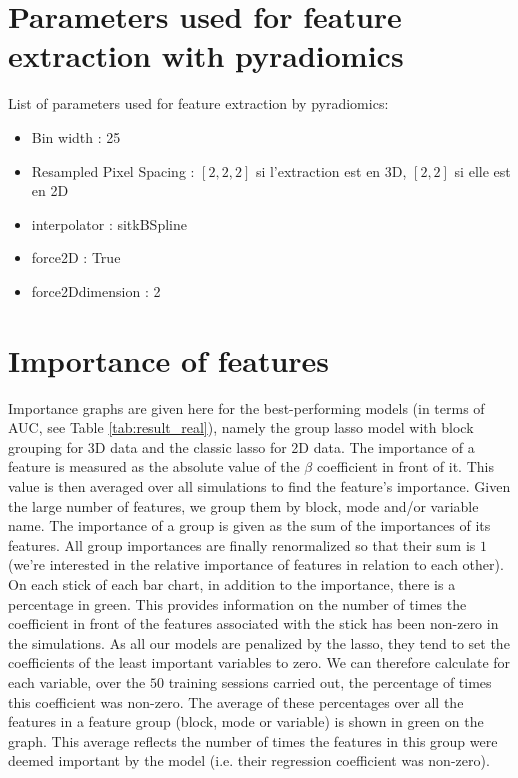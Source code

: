 \documentclass[preprint,12pt]{elsarticle}
\begin{document}
\newpage

\section{Parameters used for feature extraction with pyradiomics}
\label{annexeparam}

List of parameters used for feature extraction by pyradiomics:
 
\begin{itemize}[label = $\bullet$]
    \item Bin width : 25
    \item Resampled Pixel Spacing : $[2,2,2]$ si l'extraction est en 3D, $[2,2]$ si elle est en 2D
    \item interpolator : sitkBSpline
    \item force2D : True
    \item force2Ddimension : 2
\end{itemize}


\newpage 
\section{Importance of features}
\label{annexe:importance}
\noindent Importance graphs are given here for the best-performing models (in terms of AUC, see Table \ref{tab:result_real}), namely the group lasso model with block grouping for 3D data and the classic lasso for 2D data. The importance of a feature is measured as the absolute value of the $\beta$ coefficient in front of it. This value is then averaged over all simulations to find the feature's importance. Given the large number of features, we group them by block, mode and/or variable name. The importance of a group is given as the sum of the importances of its features. All group importances are finally renormalized so that their sum is $1$ (we're interested in the relative importance of features in relation to each other). \\
\indent On each stick of each bar chart, in addition to the importance, there is a percentage in green. This provides information on the number of times the coefficient in front of the features associated with the stick has been non-zero in the simulations. As all our models are penalized by the lasso, they tend to set the coefficients of the least important variables to zero. We can therefore calculate for each variable, over the $50$ training sessions carried out, the percentage of times this coefficient was non-zero. The average of these percentages over all the features in a feature group (block, mode or variable) is shown in green on the graph. This average reflects the number of times the features in this group were deemed important by the model (i.e. their regression coefficient was non-zero).
\end{document}
